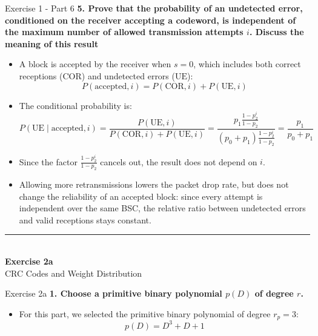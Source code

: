 \documentclass[10pt, aspectratio=169]{beamer}
\newcommand{\question}[1]{{\color{QuestionRed}\textbf{#1}}}
\begin{document}
\begin{frame}{Exercise 1 - Part 6}
	\question{5. Prove that the probability of an undetected error, conditioned on the receiver accepting a codeword, is independent of the maximum number of allowed transmission attempts $i$. Discuss the meaning of this result}
	
\vspace{0.2cm}
\footnotesize
\begin{itemize}
	\item A block is accepted by the receiver when $s = 0$, which includes both correct receptions ($\text{COR}$) and undetected errors ($\text{UE}$):
	\[
	P(\text{accepted}, i) = P(\text{COR}, i) + P(\text{UE}, i)
	\]
	\item The conditional probability is:
	\[
	P(\text{UE} \mid \text{accepted}, i) = \frac{P(\text{UE}, i)}{P(\text{COR}, i) + P(\text{UE}, i)} = \frac{p_1 \frac{1 - p_2^i}{1 - p_2}}{(p_0 + p_1) \frac{1 - p_2^i}{1 - p_2}} = \frac{p_1}{p_0 + p_1}
	\]
	\item Since the factor $\frac{1 - p_2^i}{1 - p_2}$ cancels out, the result does not depend on $i$.
	\item Allowing more retransmissions lowers the packet drop rate, but does not change the reliability of an accepted block: since every attempt is independent over the same BSC, the relative ratio between undetected errors and valid receptions stays constant.
\end{itemize}
\end{frame}
\begin{frame}[plain]
  \vfill
  \centering
  {\color{TealAccent}\rule{2cm}{2pt}}\\[0.4cm]
  {\LARGE\bfseries\color{NavyPrimary} Exercise 2a}\\[0.2cm]
  {\large\color{SlateNeutral} CRC Codes and Weight Distribution}
  \vfill
\end{frame}

\begin{frame}{Exercise 2a}
  \question{1. Choose a primitive binary polynomial $p(D)$ of degree $r$.}

  \vspace{0.3cm}
  \begin{itemize}
    \item For this part, we selected the primitive binary polynomial of degree $r_p = 3$:
    \[
      p(D) = D^3 + D + 1
    \]
  \end{itemize}
\end{frame}
\end{document}

